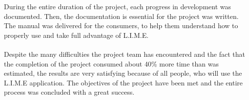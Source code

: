 \documentclass[a4paper,11pt,twoside]{report}
\theoremstyle{definition}
\begin{document}
During the entire duration of the project, each progress in development was documented. Then, the documentation is essential for the project was written. The manual was delivered for the consumers, to help them understand how to properly use and take full advantage of L.I.M.E. \\ \\
Despite the many difficulties the project team has encountered and the fact that the completion of the project consumed about 40\% more time than was estimated, the results are very satisfying because of all people, who will use the L.I.M.E application. The objectives of the project have been met and the entire process was concluded with a great success.


\thispagestyle{empty}




\end{document}
